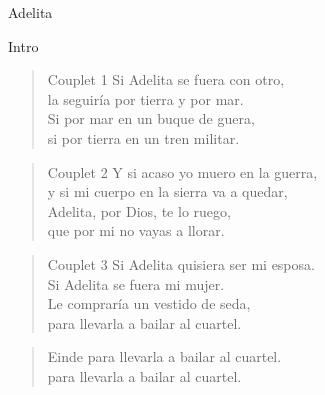 \begin{song}{Adelita}

\begin{instrumental}{Intro}
 \measure{}  \measure{}  \measure{}  
 \measure{}  \measure{}  \measure{}  
\end{instrumental}

\begin{verse}{Couplet 1}
Si Adelita se fuera con otro,\\
la seguir\'ia por tierra y por mar.\\
Si por mar en un buque de guera,\\
si por tierra en un tren militar.\\
\end{verse}

\begin{verse}{Couplet 2}
Y si acaso yo muero en la guerra,\\
y si mi cuerpo en la sierra va a quedar,\\
Adelita, por Dios, te lo ruego,\\
que por mi no vayas a llorar.\\
\end{verse}

\begin{verse}{Couplet 3}
Si Adelita quisiera ser mi esposa.\\
Si Adelita se fuera mi mujer.\\
Le comprar\'ia un vestido de seda,\\
para llevarla a bailar al cuartel.\\
\end{verse}

\begin{verse}{Einde}
para llevarla a bailar al cuartel.\\
para llevarla a bailar al cuartel.\\
\end{verse}
\end{song}

